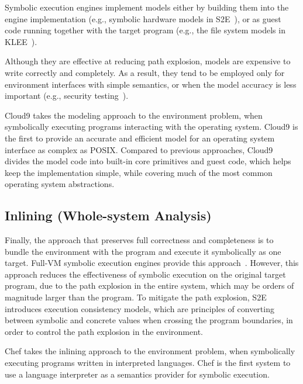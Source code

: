 Symbolic execution engines implement models either by building them into the engine implementation (e.g., symbolic hardware models in S2E~\cite{s2eSystem}), or as guest code running together with the target program (e.g., the file system models in KLEE~\cite{klee}).

Although they are effective at reducing path explosion, models are expensive to write correctly and completely.  As a result, they tend to be employed only for environment interfaces with simple semantics, or when the model accuracy is less important (e.g., security testing~\cite{aeg}).

Cloud9 takes the modeling approach to the environment problem, when symbolically executing programs interacting with the operating system.  Cloud9 is the first to provide an accurate and efficient model for an operating system interface as complex as POSIX.  Compared to previous approaches, Cloud9 divides the model code into built-in core primitives and guest code, which helps keep the implementation simple, while covering much of the most common operating system abstractions.

\subsection{Inlining (Whole-system Analysis)}


Finally, the approach that preserves full correctness and completeness is to bundle the environment with the program and execute it symbolically as one target.
%
Full-VM symbolic execution engines provide this approach~\cite{s2e,bitBlaze}.
%
However, this approach reduces the effectiveness of symbolic execution on the original target program, due to the path explosion in the entire system, which may be orders of magnitude larger than the program.
%
To mitigate the path explosion, S2E introduces execution consistency models, which are principles of converting between symbolic and concrete values when crossing the program boundaries, in order to control the path explosion in the environment.

Chef takes the inlining approach to the environment problem, when symbolically executing programs written in interpreted languages.  Chef is the first system to use a language interpreter as a semantics provider for symbolic execution.



